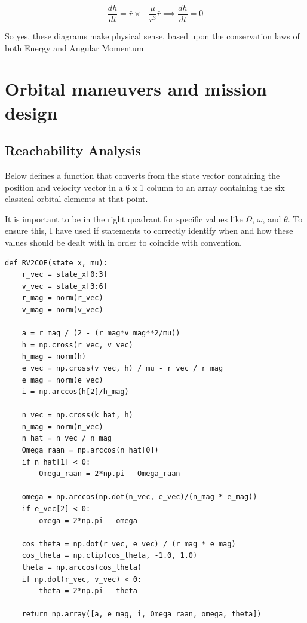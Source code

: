 \documentclass[12pt,twocolumn]{article}  %
\begin{document}
\begin{equation}
\frac{dh}{dt} = \bar{r} \times -\frac{\mu}{r^{3}}\bar{r} \implies \frac{dh}{dt} = 0
\end{equation}
\vspace{0.2cm}

So yes, these diagrams make physical sense, based upon the conservation laws of both Energy and Angular Momentum


\section{Orbital maneuvers and mission design}
\subsection{Reachability Analysis}
Below defines a function that converts from the state vector containing the position and velocity vector in a 6 x 1 column
to an array containing the six classical orbital elements at that point.

It is important to be in the right quadrant for specific values like $\Omega$, $\omega$, and $\theta$. To ensure this, I have used if statements
to correctly identify when and how these values should be dealt with in order to coincide with convention.
\begin{lstlisting}
def RV2COE(state_x, mu):
    r_vec = state_x[0:3]
    v_vec = state_x[3:6]
    r_mag = norm(r_vec)
    v_mag = norm(v_vec)
    
    a = r_mag / (2 - (r_mag*v_mag**2/mu))
    h = np.cross(r_vec, v_vec)
    h_mag = norm(h)
    e_vec = np.cross(v_vec, h) / mu - r_vec / r_mag
    e_mag = norm(e_vec)
    i = np.arccos(h[2]/h_mag)
    
    n_vec = np.cross(k_hat, h)
    n_mag = norm(n_vec)
    n_hat = n_vec / n_mag
    Omega_raan = np.arccos(n_hat[0])
    if n_hat[1] < 0:
        Omega_raan = 2*np.pi - Omega_raan
    
    omega = np.arccos(np.dot(n_vec, e_vec)/(n_mag * e_mag))
    if e_vec[2] < 0:
        omega = 2*np.pi - omega
        
    cos_theta = np.dot(r_vec, e_vec) / (r_mag * e_mag)
    cos_theta = np.clip(cos_theta, -1.0, 1.0)  
    theta = np.arccos(cos_theta)
    if np.dot(r_vec, v_vec) < 0:
        theta = 2*np.pi - theta
    
    return np.array([a, e_mag, i, Omega_raan, omega, theta])
\end{lstlisting}
\end{document}
